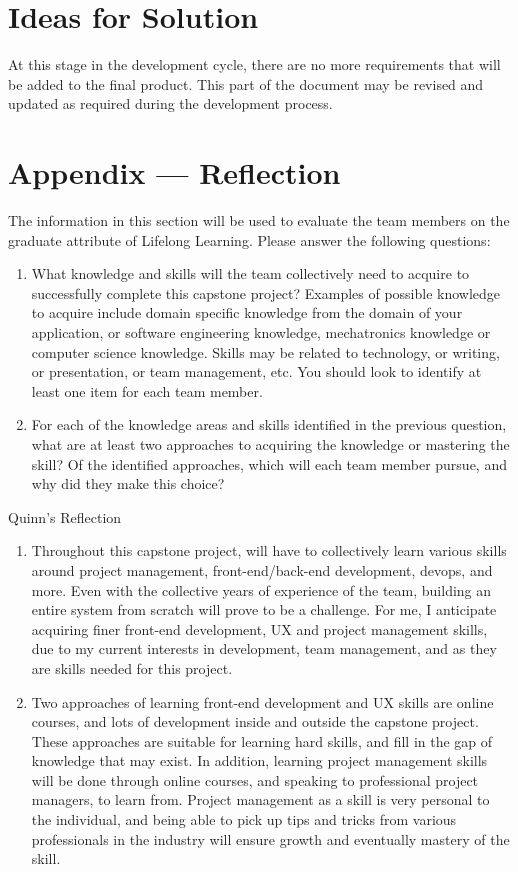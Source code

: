 \documentclass[12pt]{article}
\begin{document}
\section{Ideas for Solution}
At this stage in the development cycle, there are no more requirements that will be added to the final product. This part of the document may be revised and updated as required during the development process.

\newpage{}
\section*{Appendix --- Reflection}

The information in this section will be used to evaluate the team members on the
graduate attribute of Lifelong Learning.  Please answer the following questions:

\begin{enumerate}
  \item What knowledge and skills will the team collectively need to acquire to
  successfully complete this capstone project?  Examples of possible knowledge
  to acquire include domain specific knowledge from the domain of your
  application, or software engineering knowledge, mechatronics knowledge or
  computer science knowledge.  Skills may be related to technology, or writing,
  or presentation, or team management, etc.  You should look to identify at
  least one item for each team member.
  \item For each of the knowledge areas and skills identified in the previous
  question, what are at least two approaches to acquiring the knowledge or
  mastering the skill?  Of the identified approaches, which will each team
  member pursue, and why did they make this choice?
\end{enumerate}

Quinn's Reflection
\begin{enumerate}
    \item Throughout this capstone project, will have to collectively learn various skills around project management, front-end/back-end development, devops, and more. Even with the collective years of experience of the team, building an entire system from scratch will prove to be a challenge. For me, I anticipate acquiring finer front-end development, UX and project management skills, due to my current interests in development, team management, and as they are skills needed for this project.

    \item Two approaches of learning front-end development and UX skills are online courses, and lots of development inside and outside the capstone project. These approaches are suitable for learning hard skills, and fill in the gap of knowledge that may exist. In addition, learning project management skills will be done through online courses, and speaking to professional project managers, to learn from. Project management as a skill is very personal to the individual, and being able to pick up tips and tricks from various professionals in the industry will ensure growth and eventually mastery of the skill.
\end{enumerate}
\end{document}
